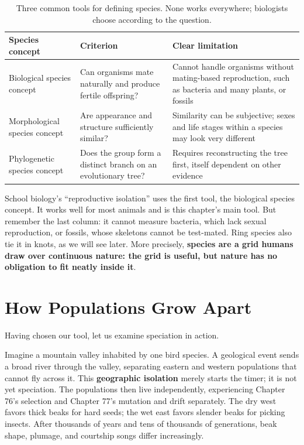 \begin{table}[htbp]
\centering
\begin{tabular}{p{3.2cm}p{4.6cm}p{4.6cm}}
\toprule
Species concept & Criterion & Clear limitation \\
\midrule
Biological species concept & Can organisms mate naturally and produce fertile offspring? & Cannot handle organisms without mating-based reproduction, such as bacteria and many plants, or fossils \\
Morphological species concept & Are appearance and structure sufficiently similar? & Similarity can be subjective; sexes and life stages within a species may look very different \\
Phylogenetic species concept & Does the group form a distinct branch on an evolutionary tree? & Requires reconstructing the tree first, itself dependent on other evidence \\
\bottomrule
\end{tabular}
\caption{Three common tools for defining species. None works everywhere; biologists choose according to the question.}
\end{table}

School biology's ``reproductive isolation'' uses the first tool, the biological species concept. It works well for most animals and is this chapter's main tool. But remember the last column: it cannot measure bacteria, which lack sexual reproduction, or fossils, whose skeletons cannot be test-mated. Ring species also tie it in knots, as we will see later. More precisely, \textbf{species are a grid humans draw over continuous nature: the grid is useful, but nature has no obligation to fit neatly inside it}.

\section{How Populations Grow Apart}

Having chosen our tool, let us examine speciation in action.

Imagine a mountain valley inhabited by one bird species. A geological event sends a broad river through the valley, separating eastern and western populations that cannot fly across it. This \textbf{geographic isolation} merely starts the timer; it is not yet speciation. The populations then live independently, experiencing Chapter 76's selection and Chapter 77's mutation and drift separately. The dry west favors thick beaks for hard seeds; the wet east favors slender beaks for picking insects. After thousands of years and tens of thousands of generations, beak shape, plumage, and courtship songs differ increasingly.

